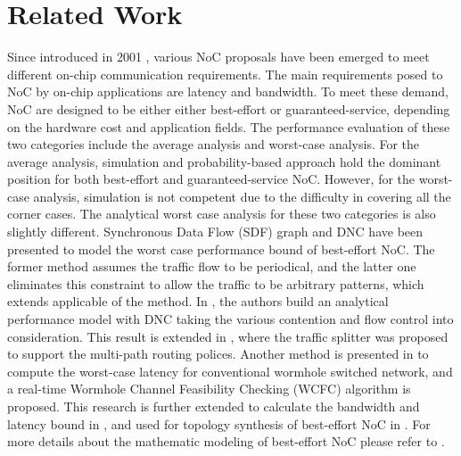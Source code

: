 \documentclass[10pt,journal]{IEEEtran}
\begin{document}
\section{Related Work}\label{related}
Since introduced in 2001 \cite{DaTo01}, various NoC proposals have been emerged to meet different on-chip communication requirements. The main requirements posed to NoC by on-chip applications are latency and bandwidth. To meet these demand, NoC are designed to be either either best-effort or guaranteed-service, depending on the hardware cost and application fields. The performance evaluation of these two categories include the average analysis and worst-case analysis. For the average analysis, simulation and probability-based approach hold the dominant position for both best-effort and guaranteed-service NoC. However, for the worst-case analysis, simulation is not competent due to the difficulty in covering all the corner cases. The analytical worst case analysis for these two categories is also slightly different. Synchronous Data Flow (SDF) graph \cite{poplavko2003task} and DNC \cite{qian2009analysis} have been presented to model the worst case performance bound of best-effort NoC. The former method assumes the traffic flow to be periodical, and the latter one eliminates this constraint to allow the traffic to be arbitrary patterns, which extends applicable of the method. In \cite{qian2009analysis}, the authors build an analytical performance model with DNC taking the various contention and flow control into consideration. This result is extended in \cite{Du:2012:WPA:2380445.2380469}, where the traffic splitter was proposed to support the multi-path routing polices. Another method is presented in \cite{Lee:2003:RWC:846077.846083} to compute the worst-case latency for conventional wormhole switched network, and a real-time Wormhole Channel Feasibility Checking (WCFC) algorithm is proposed. This research is further extended to calculate the bandwidth and latency bound in \cite{6109240}, and used for topology synthesis of best-effort NoC in \cite{EPFL-ARTICLE-186879}. For more details about the mathematic modeling of best-effort NoC please refer to \cite{Kiasari:2013:MFP:2480741.2480755}.
\end{document}
